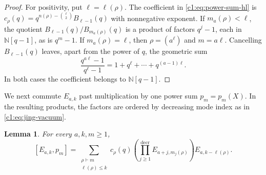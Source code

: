 \documentclass[12pt,reqno,a4paper]{amsart}
\numberwithin{equation}{section}
\numberwithin{figure}{section}
\theoremstyle{plain}
\newtheorem{lemma}[theorem]{Lemma}
\theoremstyle{definition}
\begin{document}
\begin{proof}
For positivity, put $\ell=\ell(\rho)$.  The coefficient
in \eqref{c1:eq:power-sum-hl} is $c_\rho(q)=q^{n(\rho)-\binom{\ell}{2}}B_{\ell-1}(q)$
with nonnegative exponent.  If $m_a(\rho)<\ell$, the quotient $B_{\ell-1}(q)/B_{m_a(\rho)}(q)$
is a product of factors $q^j-1$, each in $\mathbb N[q-1]$, as is $q^m-1$.
If $m_a(\rho)=\ell$, then $\rho=(a^\ell)$ and $m=a\ell$.  Cancelling $B_{\ell-1}(q)$ leaves,
apart from the power of $q$, the geometric sum
\[
 \frac{q^{a\ell}-1}{q^\ell-1}=1+q^\ell+\cdots+q^{(a-1)\ell}.
\]
In both cases the coefficient belongs to $\mathbb N[q-1]$.
\end{proof}

We next commute $E_{a,k}$ past multiplication by one power sum
$p_m=p_m(X)$.  In the resulting products, the factors are ordered
by decreasing mode index as in \eqref{c1:eq:jing-vacuum}.

\begin{lemma}\label{c1:lem:positive-commutation}
For every $a,k,m\geq1$,
\begin{equation}\label{c1:eq:positive-commutation}
 [E_{a,k},p_m]
 =\sum_{\substack{\rho\vdash m\\\ell(\rho)\leq k}}
 c_\rho(q)
 \left(\prod_{j\geq1}^{\mathrm{decr}}E_{a+j,m_j(\rho)}\right)
 E_{a,k-\ell(\rho)}.
\end{equation}
\end{lemma}
\end{document}
